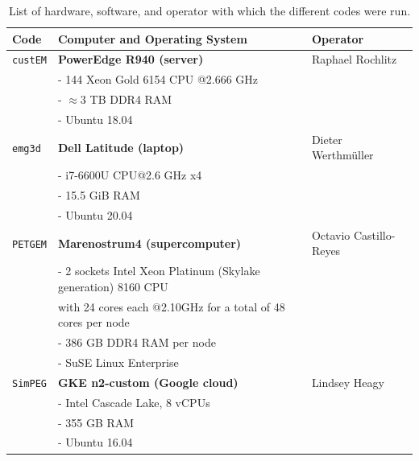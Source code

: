 \documentclass[extra, camera,%
]{gji}
\newcommand{\emg}[2]{\texttt{emg#1#2}\xspace}
\newcommand{\simpeg}{\texttt{SimPEG}\xspace}
\newcommand{\custem}{\texttt{custEM}\xspace}
\newcommand{\petgem}{\texttt{PETGEM}\xspace}
\begin{document}
%
\begin{table}
\begin{minipage}{14cm}
  \centering
  \caption{List of hardware, software, and operator with which the different codes were run.}
\label{tbl:machines}
  \begin{tabularx}{\linewidth}{lXl}
  \toprule
  Code & Computer and Operating System & Operator \\
  \midrule
  \custem & \textbf{PowerEdge R940 (server)}                  & Raphael Rochlitz \\
          & - 144 Xeon Gold 6154 CPU @2.666 GHz               & \\
          & - $\approx3$ TB DDR4 RAM                          & \\
          & - Ubuntu 18.04                                    & \\[.5em]
  \emg3d  & \textbf{Dell Latitude (laptop)}                   & Dieter Werthmüller \\
          & - i7-6600U CPU@2.6 GHz x4                         & \\
          & - 15.5 GiB RAM                                    & \\
          & - Ubuntu 20.04                                    & \\[.5em]
  \petgem & \textbf{Marenostrum4 (supercomputer)}             & Octavio Castillo-Reyes \\
          & - 2 sockets Intel Xeon Platinum (Skylake generation) 8160 CPU & \\
          & \phantom{-} with 24 cores each @2.10GHz for a total of 48 cores per node & \\
          & - 386 GB DDR4 RAM per node                        & \\
          & - SuSE Linux Enterprise                           & \\[.5em]
  \simpeg & \textbf{GKE n2-custom (Google cloud)}             & Lindsey Heagy \\
          & - Intel Cascade Lake, 8 vCPUs                     & \\
          & - 355 GB RAM                                      & \\
          & - Ubuntu 16.04                                    & \\
%
  \bottomrule
\end{tabularx}
\end{minipage}
\end{table}
%
\end{document}

